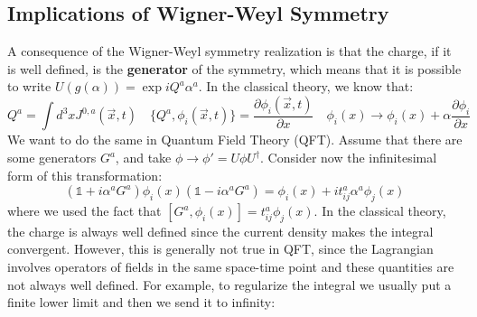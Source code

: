 \documentclass[../main.tex]{subfiles}
\begin{document}
\subsection{Implications of Wigner-Weyl Symmetry}
A consequence of the Wigner-Weyl symmetry realization is that the charge, if it is well defined, is the \textbf{generator} of the symmetry, which means that it is possible to write $U(g(\alpha))=\exp{iQ^a\alpha^a}$. In the classical theory, we know that:
\[
Q^a=\int d^3xJ^{0,a}(\Vec{x},t) \quad \{Q^a,\phi_i(\Vec{x},t)\}=\frac{\partial\phi_i(\Vec{x},t)}{\partial x} \quad \phi_i(x)\to\phi_i(x)+\alpha\frac{\partial\phi_i}{\partial x}
\]
We want to do the same in Quantum Field Theory (QFT). Assume that there are some generators $G^a$, and take $\phi\to\phi'=U\phi U^\dagger$. Consider now the infinitesimal form of this transformation:
\[
(\mathbb{1}+i\alpha^aG^a)\phi_i(x)(\mathbb{1}-i\alpha^aG^a)=\phi_i(x)+it_{ij}^a\alpha^a\phi_j(x)
\]
where we used the fact that $[G^a,\phi_i(x)]=t_{ij}^a\phi_j(x)$. In the classical theory, the charge is always well defined since the current density makes the integral convergent. However, this is generally not true in QFT, since the Lagrangian involves operators of fields in the same space-time point and these quantities are not always well defined. For example, to regularize the integral we usually put a finite lower limit and then we send it to infinity:
\end{document}
